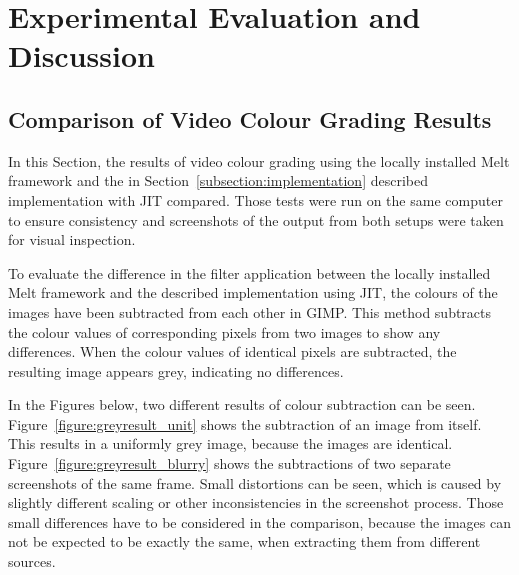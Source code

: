 \documentclass[../MasterThesis.tex]{subfiles}
\begin{document}
	
	
%
%
%
%
%
%
%
%
\newpage
\section{Experimental Evaluation and Discussion} \label{section:experimentalevaluationanddiscussion}





\subsection{Comparison of Video Colour Grading Results} \label{subsection:ComparisonVideoColourGradingResults}


In this Section, the results of video colour grading using the locally installed Melt framework and the in Section~\ref{subsection:implementation} described implementation with JIT compared. 
Those tests were run on the same computer to ensure consistency and screenshots of the output from both setups were taken for visual inspection. 


To evaluate the difference in the filter application between the locally installed Melt framework and the described implementation using JIT, the colours of the images have been subtracted from each other in GIMP. 
This method subtracts the colour values of corresponding pixels from two images to show any differences. When the colour values of identical pixels are subtracted, the resulting image appears grey, indicating no differences.

In the Figures below, two different results of colour subtraction can be seen. Figure~\ref{figure:greyresult_unit} shows the subtraction of an image from itself. This results in a uniformly grey image, because the images are identical. Figure~\ref{figure:greyresult_blurry} shows the subtractions of two separate screenshots of the same frame. Small distortions can be seen, which is caused by slightly different scaling or other inconsistencies in the screenshot process. Those small differences have to be considered in the comparison, because the images can not be expected to be exactly the same, when extracting them from different sources.
\end{document}
